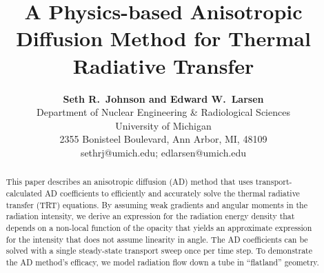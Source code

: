 \documentclass[11pt,letter,twoside]{mc2011}
\begin{document}
\title{A Physics-based Anisotropic Diffusion Method for Thermal Radiative
Transfer}

\author{
\textbf{Seth R.~Johnson and Edward W.~Larsen}\\
Department of Nuclear Engineering \& Radiological Sciences\\
University of Michigan \\
2355 Bonisteel Boulevard, Ann Arbor, MI, 48109\\
sethrj@umich.edu; edlarsen@umich.edu
}

\maketitle

\thispagestyle{empty}

\begin{abstract}
This paper describes an anisotropic diffusion (AD) method that uses
transport-calculated AD coefficients to efficiently and accurately solve the
thermal radiative transfer (TRT) equations. By assuming weak gradients and angular moments in the radiation
intensity, we derive an expression for the radiation energy density that
depends on a non-local function of the opacity that yields an approximate
expression for the intensity that does not assume linearity in angle. The AD
coefficients can be solved with a single steady-state transport sweep once per
time step.
To demonstrate the AD method's efficacy, we model radiation flow down a tube
in ``flatland'' geometry. 


\end{abstract}

\newcommand\authorname{Seth~R.~Johnson and Edward~W.~Larsen}
\newcommand\shorttitlename{A physics-based anisotropic diffusion method for TRT}


\end{document}
